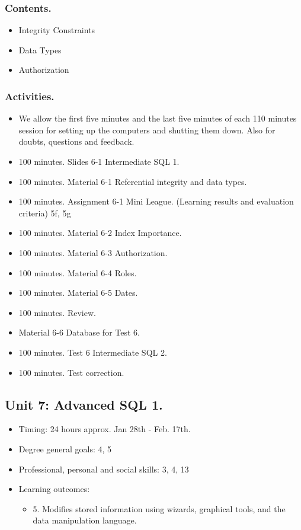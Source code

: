 \documentclass[catalan, a4paper, 12pt, titlepage]{article}
\begin{document}
  \subsubsection{Contents.}
  \begin{itemize}
	  \item Integrity Constraints
	  \item Data Types
	  \item Authorization
  \end{itemize}

  \subsubsection{Activities.}
  \begin{itemize}
          \item We allow the first five minutes and the last five minutes of each 110 minutes session for setting up the computers and shutting them down. Also for doubts, questions and feedback.
	  \item 100 minutes. Slides 6-1 Intermediate SQL 1.
	  \item 100 minutes. Material 6-1 Referential integrity and data types.
	  \item 100 minutes. Assignment 6-1 Mini League. (\faGraduationCap Learning results and evaluation criteria) 5f, 5g
	  \item 100 minutes. Material 6-2 Index Importance.
	  \item 100 minutes. Material 6-3 Authorization.
	  \item 100 minutes. Material 6-4 Roles.
	  \item 100 minutes. Material 6-5 Dates.
	  \item 100 minutes. Review.
	  \item Material 6-6 Database for Test 6.
	  \item 100 minutes. Test 6 Intermediate SQL 2.
	  \item 100 minutes. Test correction.
  \end{itemize}
  

  \subsection{Unit 7: Advanced SQL 1.}

  \begin{itemize}
	\item Timing: 24 hours approx. Jan 28th - Feb. 17th.
	\item Degree general goals: 4, 5
	\item Professional, personal and social skills: 3, 4, 13
	\item Learning outcomes: 
		\begin{itemize}
			\item 5. Modifies stored information using wizards, graphical tools, and the data manipulation language.
		\end{itemize}
  \end{itemize}
  
\end{document}

